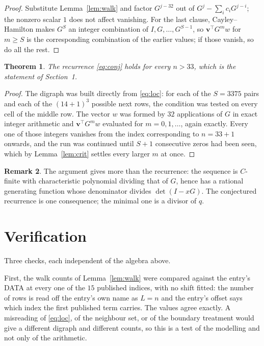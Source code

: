 \documentclass[11pt,a4paper]{article}
\theoremstyle{plain}
\newtheorem{theorem}{Theorem}
\theoremstyle{definition}
\newtheorem{remark}[theorem]{Remark}
\begin{document}
\begin{proof}
Substitute Lemma~\ref{lem:walk} and factor $G^{j-32}$ out of
$G^{j}-\sum_ic_iG^{j-i}$; the nonzero scalar $1$ does not affect
vanishing. For the last clause, Cayley--Hamilton makes $G^{S}$ an integer combination of
$I,G,\dots,G^{S-1}$, so $\mathbf{v}^{\!\top}G^{m}w$ for $m\ge S$ is the corresponding
combination of the earlier values; if those vanish, so do all the rest.
\end{proof}

\begin{theorem}
The recurrence \eqref{eq:conj} holds for every $n>33$, which is the statement of
Section~1.
\end{theorem}

\begin{proof}
The digraph was built directly from \eqref{eq:loc}: for each of the $S=3375$ pairs and each
of the $(14+1)^{3}$ possible next rows, the condition was tested on every cell of
the middle row. The vector $w$ was formed by $32$ applications of $G$ in exact integer
arithmetic and $\mathbf{v}^{\!\top}G^{m}w$ evaluated for $m=0,1,\dots$, again exactly.
Every one of those integers vanishes from the index corresponding to $n=33+1$ onwards,
and the run was continued until $S+1$ consecutive zeros had been seen, which by
Lemma~\ref{lem:crit} settles every larger $m$ at once.
\end{proof}

\begin{remark}
The argument gives more than the recurrence: the sequence is $C$-finite with characteristic
polynomial dividing that of $G$, hence has a rational generating function whose denominator
divides $\det(I-xG)$. The conjectured recurrence is one consequence; the minimal one is a
divisor of $q$.
\end{remark}

\section{Verification}

Three checks, each independent of the algebra above.

First, the walk counts of Lemma~\ref{lem:walk} were compared against the entry's DATA at
every one of the $15$ published indices, with no shift fitted: the number of rows is
read off the entry's own name as $L=n$ and the entry's offset says which index the first
published term carries. The values agree exactly. A misreading of \eqref{eq:loc}, of the
neighbour set, or of the boundary treatment would give a different digraph and different
counts, so this is a test of the modelling and not only of the arithmetic.
\end{document}
